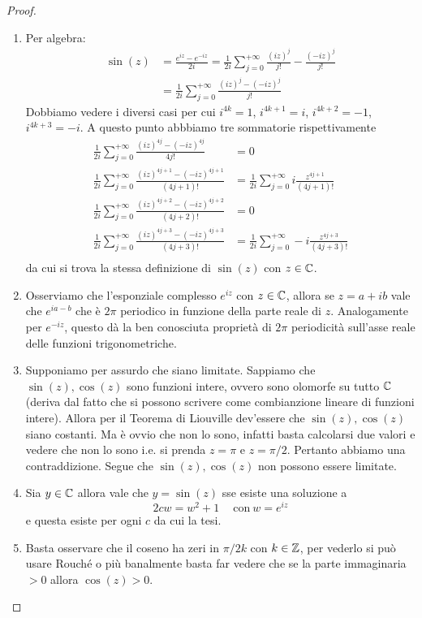 	\begin{proof}\ 
	\begin{enumerate}
		\item Per algebra:
			\begin{align*}
				\sin(z) & = \frac{e^{iz} - e^{-iz}}{2i} = \frac{1}{2i} \sum_{j=0}^{+\infty} \frac{(iz)^{j}}{j!} - \frac{(-iz)^{j}}{j!} \\
					 	& = \frac{1}{2i} \sum_{j=0}^{+\infty} \frac{(iz)^j - (-iz)^j}{j!}
			\end{align*}
			Dobbiamo vedere i diversi casi per cui $i^{4k} = 1$, $i^{4k + 1} = i$, $i^{4k + 2} = -1$, $i^{4k + 3} = -i$. A questo punto abbbiamo tre sommatorie rispettivamente 
			\begin{align*}
				\frac{1}{2i} \sum_{j=0}^{+\infty} \frac{(iz)^{4j} - (-iz)^{4j}}{4j!} & = 0 \\
				\frac{1}{2i} \sum_{j=0}^{+\infty} \frac{(iz)^{4j+1} - (-iz)^{4j+1}}{(4j+1)!} & = \frac{1}{2i} \sum_{j=0}^{+\infty} i\frac{z^{4j+1}}{(4j+1)!} \\
				\frac{1}{2i} \sum_{j=0}^{+\infty} \frac{(iz)^{4j+2} - (-iz)^{4j+2}}{(4j+2)!} & = 0 \\
				\frac{1}{2i} \sum_{j=0}^{+\infty} \frac{(iz)^{4j+3} - (-iz)^{4j+3}}{(4j+3)!} & = \frac{1}{2i} \sum_{j=0}^{+\infty} -i\frac{z^{4j+3}}{(4j+3)!} \\
			\end{align*}
			da cui si trova la stessa definizione di $\sin(z)$ con $z \in \mathbb{C}$.
		\item Osserviamo che l'esponziale complesso $e^{iz}$ con $z \in \mathbb{C}$, allora se $z = a + ib$ vale che $e^{ia - b}$ che è $2\pi$ periodico in funzione della parte reale di $z$. Analogamente per $e^{-iz}$, questo dà la ben conosciuta proprietà di $2\pi$ periodicità sull'asse reale delle funzioni trigonometriche.
		\item Supponiamo per assurdo che siano limitate. Sappiamo che $\sin(z), \cos(z)$ sono funzioni intere, ovvero sono olomorfe su tutto $\mathbb{C}$ (deriva dal fatto che si possono scrivere come combianzione lineare di funzioni intere). Allora per il Teorema di Liouville dev'essere che $\sin(z), \cos(z)$ siano costanti. Ma è ovvio che non lo sono, infatti basta calcolarsi due valori e vedere che non lo sono i.e. si prenda $z = \pi$ e $z = \pi/2$. Pertanto abbiamo una contraddizione. Segue che $\sin(z), \cos(z)$ non possono essere limitate.  
		\item Sia $y \in \mathbb{C}$ allora vale che $y = \sin(z)$ sse esiste una soluzione a 
		\begin{equation*}
			2cw = w^2 + 1 \quad\ \text{con}\ w = e^{iz}
		\end{equation*} 
		e questa esiste per ogni $c$ da cui la tesi.
		\item Basta osservare che il coseno ha zeri in $\pi/2 k$ con $k \in \mathbb{Z}$, per vederlo si può usare Rouché o più banalmente basta far vedere che se la parte immaginaria $>0$ allora $\cos(z) > 0$.    
	\end{enumerate}
	\end{proof}
	
